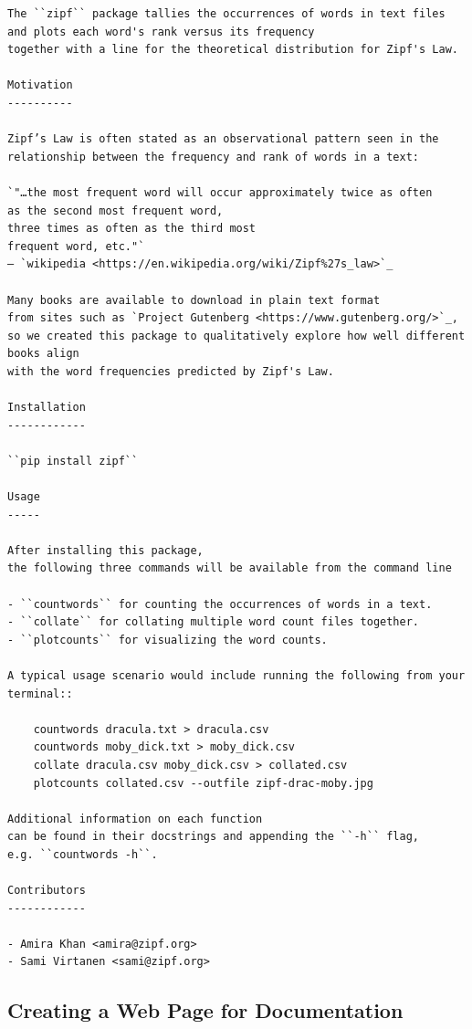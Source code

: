 \documentclass[
]{krantz}
\begin{document}
\begin{verbatim}
The ``zipf`` package tallies the occurrences of words in text files
and plots each word's rank versus its frequency
together with a line for the theoretical distribution for Zipf's Law.

Motivation
----------

Zipf’s Law is often stated as an observational pattern seen in the
relationship between the frequency and rank of words in a text:

`"…the most frequent word will occur approximately twice as often
as the second most frequent word,
three times as often as the third most
frequent word, etc."`  
— `wikipedia <https://en.wikipedia.org/wiki/Zipf%27s_law>`_

Many books are available to download in plain text format
from sites such as `Project Gutenberg <https://www.gutenberg.org/>`_,
so we created this package to qualitatively explore how well different books align
with the word frequencies predicted by Zipf's Law.

Installation
------------

``pip install zipf``

Usage
-----

After installing this package,
the following three commands will be available from the command line

- ``countwords`` for counting the occurrences of words in a text.
- ``collate`` for collating multiple word count files together.
- ``plotcounts`` for visualizing the word counts.

A typical usage scenario would include running the following from your terminal::

    countwords dracula.txt > dracula.csv
    countwords moby_dick.txt > moby_dick.csv
    collate dracula.csv moby_dick.csv > collated.csv
    plotcounts collated.csv --outfile zipf-drac-moby.jpg

Additional information on each function
can be found in their docstrings and appending the ``-h`` flag,
e.g. ``countwords -h``.

Contributors
------------

- Amira Khan <amira@zipf.org>
- Sami Virtanen <sami@zipf.org>
\end{verbatim}

\hypertarget{packaging-sphinx}{%
\subsection{Creating a Web Page for Documentation}\label{packaging-sphinx}}
\end{document}
